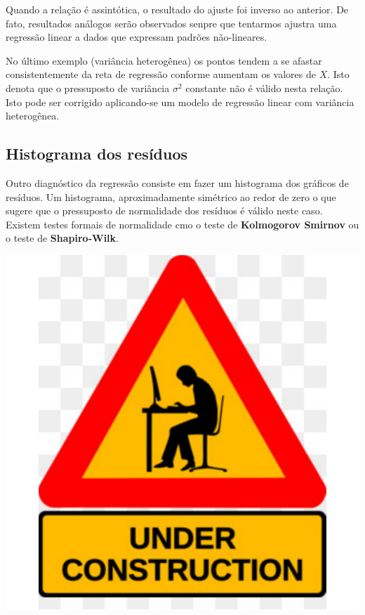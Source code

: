 \documentclass[
]{book}
\begin{document}
Quando a relação é assintótica, o resultado do ajuste foi inverso ao anterior. De fato, resultados análogos serão observados senpre que tentarmos ajustra uma regressão linear a dados que expressam padrões não-lineares.

No último exemplo (variância heterogênea) os pontos tendem a se afastar consistentemente da reta de regressão conforme aumentam os valores de \(X\). Isto denota que o pressuposto de variância \(\sigma^2\) constante não é válido nesta relação. Isto pode ser corrigido aplicando-se um modelo de regressão linear com variância heterogênea.

\hypertarget{histograma-dos-resuxedduos}{%
\subsection{Histograma dos resíduos}\label{histograma-dos-resuxedduos}}

Outro diagnóstico da regressão consiste em fazer um histograma dos gráficos de resíduos. Um histograma, aproximadamente simétrico ao redor de zero o que sugere que o pressuposto de normalidade dos resíduos é válido neste caso. Existem testes formais de normalidade cmo o teste de \textbf{Kolmogorov Smirnov} ou o teste de \textbf{Shapiro-Wilk}.

\includegraphics{probest-cambientais_files/figure-latex/unnamed-chunk-167-1.pdf}
\end{document}
